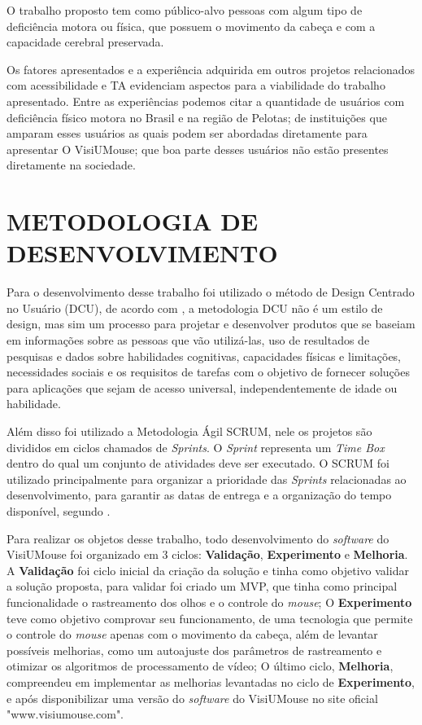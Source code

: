 O trabalho proposto tem como público-alvo pessoas com algum tipo de deficiência motora ou física, que possuem o movimento da cabeça e com a capacidade cerebral preservada.

Os fatores apresentados e a experiência adquirida em outros projetos relacionados com acessibilidade e TA evidenciam aspectos para a viabilidade do trabalho apresentado. Entre as experiências podemos citar a quantidade de usuários com deficiência físico motora no Brasil e na região de Pelotas; de instituições que amparam esses usuários as quais podem ser abordadas diretamente para apresentar O VisiUMouse; que boa parte desses usuários não estão presentes diretamente na sociedade.

\section{METODOLOGIA DE DESENVOLVIMENTO}\label{Sub:metodologia-desenvolvimento}
Para o desenvolvimento desse trabalho foi utilizado o método de Design Centrado no Usuário (DCU), de acordo com \cite{GREENHOUSE2010}, a metodologia DCU não é um estilo de design, mas sim um processo para projetar e desenvolver produtos que se baseiam em informações sobre as pessoas que vão utilizá-las, uso de resultados de pesquisas e dados sobre habilidades cognitivas, capacidades físicas e limitações, necessidades sociais e os requisitos de tarefas com o objetivo de fornecer soluções para aplicações que sejam de acesso universal, independentemente de idade ou habilidade. 

Além disso foi utilizado a Metodologia Ágil SCRUM, nele os projetos são divididos em ciclos chamados de \textit{Sprints}. O \textit{Sprint} representa um \textit{Time Box} dentro do qual um conjunto de atividades deve ser executado. O SCRUM foi utilizado principalmente para organizar a prioridade das \textit{Sprints} relacionadas ao desenvolvimento, para garantir as datas de entrega e a organização do tempo disponível, segundo .

Para realizar os objetos desse trabalho, todo desenvolvimento do \textit{software} do VisiUMouse foi organizado em 3 ciclos: \textbf{Validação}, \textbf{Experimento} e \textbf{Melhoria}. A \textbf{Validação} foi ciclo inicial da criação da solução e tinha como objetivo validar a solução proposta, para validar foi criado um MVP, que tinha como principal funcionalidade o rastreamento dos olhos e o controle do \textit{mouse}; O \textbf{Experimento} teve como objetivo comprovar seu funcionamento, de uma tecnologia que permite o controle do \textit{mouse} apenas com o movimento da cabeça, além de levantar possíveis melhorias, como um autoajuste dos parâmetros de rastreamento e otimizar os algoritmos de processamento de vídeo; O último ciclo, \textbf{Melhoria},  compreendeu em implementar as melhorias levantadas no ciclo de \textbf{Experimento}, e após disponibilizar uma versão do \textit{software} do VisiUMouse no site oficial "www.visiumouse.com".

